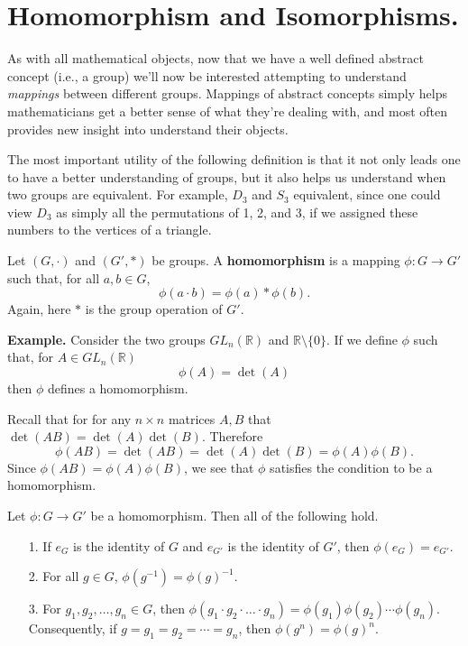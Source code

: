     \section{Homomorphism and Isomorphisms.} 
    {\color{BlueViolet}As with all mathematical objects, now that we have a well defined
    abstract concept (i.e., a group) we'll now be interested
    attempting to understand \textit{mappings} between different
    groups. Mappings of abstract concepts simply helps mathematicians
    get a better sense of what they're dealing with, and most often
    provides new insight into understand their objects. 
    
    The most important utility of the following definition is that it
    not only leads one to have a better understanding of groups, but it
    also helps us understand when two groups are equivalent. For
    example, $D_3$ and $S_3$ equivalent, since one could view $D_3$
    as simply all the permutations of 1, 2, and 3, if we assigned these
    numbers to the vertices of a triangle.
    }

    \begin{definition}
        Let $(G, \cdot)$ and $(G', *)$ be groups. A
        \textbf{homomorphism} is a mapping $\phi: G \to G'$ such that,
       for all $a, b \in G$, 
        \[
            \phi(a \cdot b) = \phi(a) * \phi(b).
        \]
        {\color{red}Again, here $*$ is the group operation of $G'$.}

    \end{definition}

    \textbf{Example.} Consider the two groups $GL_n(\mathbb{R})$ and
    $\mathbb{R}\setminus\{0\}$. If we define $\phi$ such that, for $A \in
    GL_n(\mathbb{R})$ 
    \[
        \phi(A) = \det(A)
    \]
    then $\phi$ defines a homomorphism. 
    
    Recall that for for any $n
    \times n$ matrices $A, B$ that $\det(AB) = \det(A)\det(B)$.
    Therefore 
    \[
        \phi(AB) = \det(AB) = \det(A)\det(B) = \phi(A)\phi(B).
    \]
    Since $\phi(AB) = \phi(A)\phi(B)$, we see that $\phi$ satisfies
    the condition to be a homomorphism.

    \begin{proposition}
        Let $\phi: G \to G'$ be a homomorphism. Then all of the
        following hold.
        \begin{itemize}
            \item[1.] If $e_G$ is the identity of $G$ and $e_{G'}$ is
            the identity of $G'$, then $\phi(e_G) = e_{G'}$.

            \item[2.] For all $g \in G$, $\phi(g^{-1}) =
            \phi(g)^{-1}$. 

            \item[3.] For $g_1, g_2, \dots, g_n \in G$, then $\phi(g_1
            \cdot g_2 \cdot \dots \cdot g_n) =
            \phi(g_1)\phi(g_2)\cdots\phi(g_n)$. Consequently, if $g = g_1 =
            g_2 = \cdots = g_n$, then $\phi(g^n) = \phi(g)^{n}$.
        \end{itemize}
    \end{proposition}

